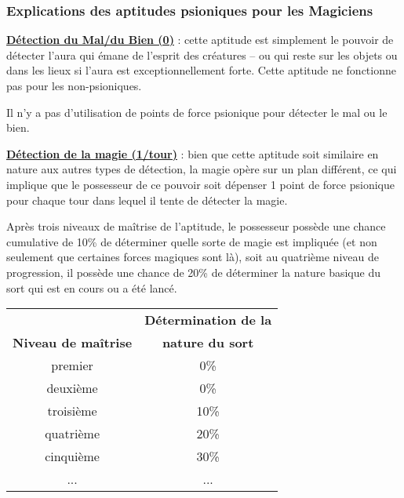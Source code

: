 \subsubsection*{Explications des aptitudes psioniques pour les Magiciens}

\label{magicien-detection-mal}\textbf{\uline{Détection du Mal/du Bien (0)}} : cette aptitude est simplement le pouvoir de détecter l'aura qui émane de l'esprit des créatures -- ou qui reste sur les objets ou dans les lieux si l'aura est exceptionnellement forte. Cette aptitude ne fonctionne pas pour les non-psioniques.

\bigskip

Il n'y a pas d'utilisation de points de force psionique pour détecter le mal ou le bien.

\bigskip

\label{magicien-magie}\textbf{\uline{Détection de la magie (1/tour)}} : bien que cette aptitude soit similaire en nature aux autres types de détection, la magie opère sur un plan différent, ce qui implique que le possesseur de ce pouvoir soit dépenser 1 point de force psionique pour chaque tour dans lequel il tente de détecter la magie.

\bigskip

Après trois niveaux de maîtrise de l'aptitude, le possesseur possède une chance cumulative de 10\% de déterminer quelle sorte de magie est impliquée (et non seulement que certaines forces magiques sont là), soit au quatrième niveau de progression, il possède une chance de 20\% de déterminer la nature basique du sort qui est en cours ou a été lancé.

\bigskip

\begin{tabular}{cc}
                            &\textbf{Détermination de la} \\
\textbf{Niveau de maîtrise} & \textbf{nature du sort} \\
premier     & 0\%   \\
deuxième    & 0\%   \\
troisième   & 10\%  \\
quatrième   & 20\%  \\
cinquième   & 30\%  \\
...         & ...    \\
\end{tabular}

